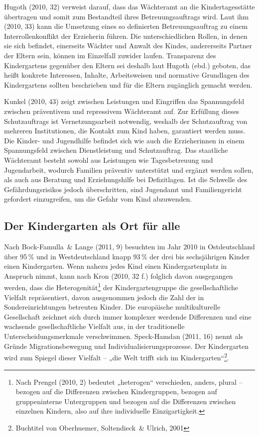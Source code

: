 Hugoth (2010, 32) verweist darauf, dass das Wächteramt an die Kindertagesstätte übertragen und somit zum Bestandteil ihres Betreuungsauftrags wird. Laut ihm (2010, 33) kann die Umsetzung eines so definierten Betreuungsauftrag zu einem Interrollenkonflikt der Erzieherin führen. Die unterschiedlichen Rollen, in denen sie sich befindet, einerseits Wächter und Anwalt des Kindes, andererseits Partner der Eltern sein, können im Einzelfall zuwider laufen. Transparenz des Kindergartens gegenüber den Eltern sei deshalb laut Hugoth (ebd.) geboten, das heißt konkrete Interessen, Inhalte, Arbeitsweisen und normative Grundlagen des Kindergartens sollten beschrieben und für die Eltern zugänglich gemacht werden. 

Kunkel (2010, 43) zeigt zwischen Leistungen und Eingriffen das Spannungsfeld zwischen präventivem und repressivem Wächteramt auf. Zur Erfüllung dieses Schutzauftrags ist Vernetzungsarbeit notwendig, weshalb der Schutzauftrag von mehreren Institutionen, die Kontakt zum Kind haben, garantiert werden muss.
Die Kinder- und Jugendhilfe befindet sich wie auch die Erzieherinnen in einem Spannungsfeld zwischen Dienstleistung und Schutzauftrag. Das staatliche Wächteramt besteht sowohl aus Leistungen wie Tagesbetreuung und Jugendarbeit, wodurch Familien präventiv unterstützt und ergänzt werden sollen, als auch aus Beratung und Erziehungshilfe bei Defizitlagen. Ist die Schwelle des Gefährdungsrisikos jedoch überschritten, sind Jugendamt und Familiengericht gefordert einzugreifen, um die Gefahr vom Kind abzuwenden. 

\subsection{Der Kindergarten als Ort für alle}\label{OrtFuerAlle}
Nach Bock-Famulla~\& Lange (2011, 9) besuchten im Jahr 2010 in Ostdeutschland über 95\,\% und in Westdeutschland knapp 93\,\% der drei bis sechsjährigen Kinder einen Kindergarten. Wenn nahezu jedes Kind einen Kindergartenplatz in Anspruch nimmt, kann nach Kron (2010, 32 f.) folglich davon ausgegangen werden, dass die Heterogenität\footnote{Nach Prengel (2010, 2) bedeutet „heterogen“ verschieden, anders, plural – bezogen auf die Differenzen zwischen Kindergruppen, bezogen auf gruppeninterne Untergruppen und bezogen auf die Differenzen zwischen einzelnen Kindern, also auf ihre individuelle Einzigartigkeit.}
der Kindergartengruppe die gesellschaftliche Vielfalt repräsentiert, davon ausgenommen jedoch die Zahl der in Sondereinrichtungen betreuten Kinder. Die europäische multikulturelle Gesellschaft zeichnet sich durch immer komplexer werdende Differenzen und eine wachsende gesellschaftliche Vielfalt aus, in der traditionelle Unterscheidungsmerkmale verschwimmen. Speck-Hamdan (2011, 16) nennt als Gründe Migrationsbewegung und Individualisierungsprozesse. Der Kindergarten wird zum Spiegel dieser Vielfalt – „die Welt trifft sich im Kindergarten“\footnote{Buchtitel von Oberhuemer, Soltendieck~\& Ulrich, 2001}.
 
